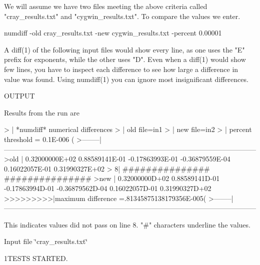 \begin{DoxyVerb}We will assume we have two files meeting the above criteria called
"cray_results.txt" and "cygwin_results.txt". To compare the values
we enter.

  numdiff -old cray_results.txt -new cygwin_results.txt -percent 0.00001

A diff(1) of the following input files would show every line, as one
uses the "E" prefix for exponents, while the other uses "D". Even when a
diff(1) would show few lines, you have to inspect each difference to see
how large a difference in value was found. Using numdiff(1) you can
ignore most insignificant differences.

OUTPUT

Results from the run are

  >        | *numdiff* numerical differences
  >        | old file=in1
  >        | new file=in2
  >        | percent threshold =  0.1E-006 (%
  >--------|------------------------------------------------------------------------------------------------------------
  >old     |    0.32000000E+02    0.88589141E-01   -0.17863993E-01   -0.36879559E-04    0.16022057E-01    0.31990327E+02
  >       8|                                       ###############   ###############
  >new     |    0.32000000D+02    0.88589141D-01   -0.17863994D-01   -0.36879562D-04    0.16022057D-01    0.31990327D+02
  >>>>>>>>>|maximum difference =.81345875138179356E-005(%
  >--------|------------------------------------------------------------------------------------------------------------

This indicates values did not pass on line 8. "#" characters underline the values.
\end{DoxyVerb}


Input file \char`\"{}cray\+\_\+results.\+txt\char`\"{}

1\+T\+E\+S\+TS S\+T\+A\+R\+T\+ED.

